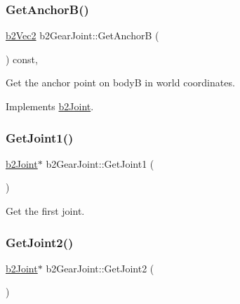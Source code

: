 \subsubsection{\texorpdfstring{GetAnchorB()}{GetAnchorB()}}
{\footnotesize\ttfamily \mbox{\hyperlink{structb2_vec2}{b2\+Vec2}} b2\+Gear\+Joint\+::\+Get\+AnchorB (\begin{DoxyParamCaption}{ }\end{DoxyParamCaption}) const\hspace{0.3cm}{\ttfamily [override]}, {\ttfamily [virtual]}}



Get the anchor point on bodyB in world coordinates. 



Implements \mbox{\hyperlink{classb2_joint_a88e947c65d4ea26fe539f02a8cb7f7a9}{b2\+Joint}}.

\mbox{\label{classb2_gear_joint_acd3fb38982319f387d1eb7aeddd5311f}} 
\subsubsection{\texorpdfstring{GetJoint1()}{GetJoint1()}}
{\footnotesize\ttfamily \mbox{\hyperlink{classb2_joint}{b2\+Joint}}$\ast$ b2\+Gear\+Joint\+::\+Get\+Joint1 (\begin{DoxyParamCaption}{ }\end{DoxyParamCaption})\hspace{0.3cm}{\ttfamily [inline]}}



Get the first joint. 

\mbox{\label{classb2_gear_joint_af1673b8edd80f3ae3b868c3a18b7b058}} 
\subsubsection{\texorpdfstring{GetJoint2()}{GetJoint2()}}
{\footnotesize\ttfamily \mbox{\hyperlink{classb2_joint}{b2\+Joint}}$\ast$ b2\+Gear\+Joint\+::\+Get\+Joint2 (\begin{DoxyParamCaption}{ }\end{DoxyParamCaption})\hspace{0.3cm}{\ttfamily [inline]}}



